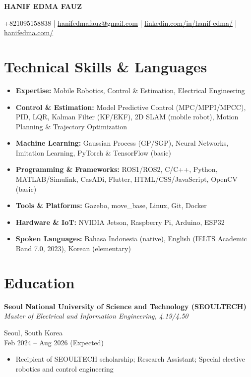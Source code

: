 \documentclass[a4paper,10pt]{article}
\begin{document}
\pagestyle{empty}

\begin{center}
    {\Large \textbf{HANIF EDMA FAUZ}} \\ \vspace{10pt}

    +821095158838 \quad | \quad \href{mailto:hanifedmafauz@gmail.com}{hanifedmafauz@gmail.com} \quad | \quad \href{https://www.linkedin.com/in/hanif-edma/}{linkedin.com/in/hanif-edma/} \quad | \quad \href{https://hanifedma.com/}{hanifedma.com/}
\end{center}

\section*{Technical Skills \& Languages}

\begin{itemize}[leftmargin=*, noitemsep]
    \item \textbf{Expertise:} Mobile Robotics, Control \& Estimation, Electrical Engineering
    \item \textbf{Control \& Estimation:} Model Predictive Control (MPC/MPPI/MPCC), PID, LQR, Kalman Filter (KF/EKF), 2D SLAM (mobile robot), Motion Planning \& Trajectory Optimization
    \item \textbf{Machine Learning:} Gaussian Process (GP/SGP), Neural Networks, Imitation Learning, PyTorch \& TensorFlow (basic)
    \item \textbf{Programming \& Frameworks:} ROS1/ROS2, C/C++, Python, MATLAB/Simulink, CasADi, Flutter, HTML/CSS/JavaScript, OpenCV (basic)
    \item \textbf{Tools \& Platforms:} Gazebo, move\_base, Linux, Git, Docker
    \item \textbf{Hardware \& IoT:} NVIDIA Jetson, Raspberry Pi, Arduino, ESP32
    \item \textbf{Spoken Languages:} Bahasa Indonesia (native), English (IELTS Academic Band 7.0, 2023), Korean (elementary)
\end{itemize}

\section*{Education}

\noindent
\begin{minipage}[t]{0.68\textwidth}
    \textbf{Seoul National University of Science and Technology (SEOULTECH)} \\
    \textit{Master of Electrical and Information Engineering, 4.19/4.50}
\end{minipage}%
\begin{minipage}[t]{0.32\textwidth}
    \raggedleft
    Seoul, South Korea \\
    Feb 2024 -- Aug 2026 (Expected)
\end{minipage}
\begin{itemize}[leftmargin=*, noitemsep]
    \item Recipient of SEOULTECH scholarship; Research Assistant; Special elective robotics and control engineering
\end{itemize}
\end{document}

